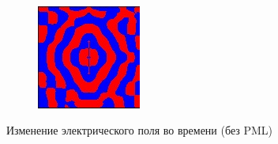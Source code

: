 \begin{figure}[p]
\begin{subfigure}[b]{0.3\textwidth}
    \end{subfigure}
    ~
    \begin{subfigure}[b]{0.3\textwidth}
        \includegraphics[width=\textwidth]{include/graphics/pml-off-5}
    \end{subfigure}

    \caption{Изменение электрического поля во времени (без PML)}\label{fig:EzPmlOff}
\end{figure}

